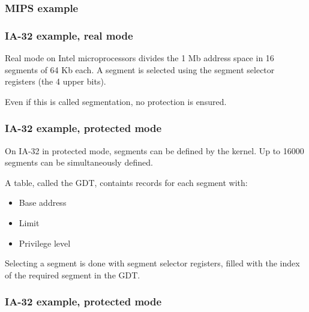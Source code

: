 
\begin{frame}
  \frametitle{MIPS example}

  \begin{center}
  \end{center}

\end{frame}


\begin{frame}
  \frametitle{IA-32 example, real mode}

  Real mode on Intel microprocessors divides the 1 Mb address space in
  16 segments of 64 Kb each. A segment is selected using the segment
  selector registers (the 4 upper bits).

  \-

  Even if this is called segmentation, no protection is ensured.

\end{frame}


\begin{frame}
  \frametitle{IA-32 example, protected mode}

  On IA-32 in protected mode, segments can be defined by the
  kernel. Up to 16000 segments can be simultaneously defined.

  \-

  A table, called the GDT, containts records for each segment with:

  \begin{itemize}
  \item
    Base address
  \item
    Limit
  \item
    Privilege level
  \end{itemize}

  \-

  Selecting a segment is done with segment selector registers, filled
  with the index of the required segment in the GDT.

\end{frame}


\begin{frame}
  \frametitle{IA-32 example, protected mode}

  \begin{center}
  \end{center}

\end{frame}

